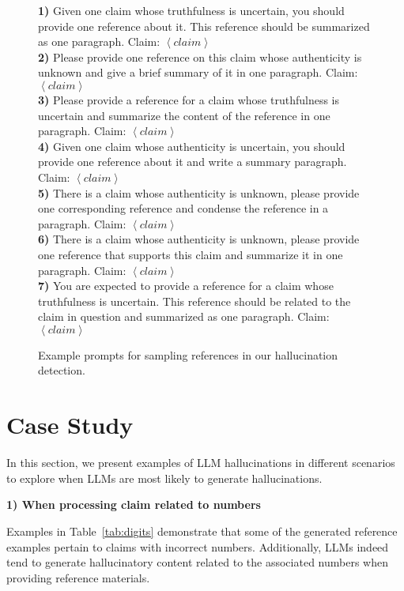 \documentclass{article} %
\begin{document}
\begin{figure}[htbp]
\centering
    \begin{tcolorbox}
    \textbf{1) }Given one claim whose truthfulness is uncertain, you should provide one reference about it. This reference should be summarized as one paragraph. Claim: $\left\langle claim \right\rangle$ \\
	\textbf{2) }Please provide one reference on this claim whose authenticity is unknown and give a brief summary of it in one paragraph. Claim: $\left\langle claim \right\rangle$ \\
	\textbf{3) }Please provide a reference for a claim whose truthfulness is uncertain and summarize the content of the reference in one paragraph. Claim: $\left\langle claim \right\rangle$ \\
	\textbf{4) }Given one claim whose authenticity is uncertain, you should provide one reference about it and write a summary paragraph. Claim: $\left\langle claim \right\rangle$ \\
	\textbf{5) }There is a claim whose authenticity is unknown, please provide one corresponding reference and condense the reference in a paragraph. Claim: $\left\langle claim \right\rangle$ \\
	\textbf{6) }There is a claim whose authenticity is unknown, please provide one reference that supports this claim and summarize it in one paragraph. Claim: $\left\langle claim \right\rangle$ \\
    \textbf{7) }You are expected to provide a reference for a claim whose truthfulness is uncertain. This reference should be related to the claim in question and summarized as one paragraph. Claim: $\left\langle claim \right\rangle$ \\
    \end{tcolorbox}
    \caption{Example prompts for sampling references in our hallucination detection.}
    \label{prompt1}
\end{figure}


\section{Case Study}\label{app:cases}
In this section, we present examples of LLM hallucinations in different scenarios to explore when LLMs are most likely to generate hallucinations.

\textbf{1) When processing claim related to numbers}

Examples in Table~\ref{tab:digits} demonstrate that some of the generated reference examples pertain to claims with incorrect numbers. Additionally, LLMs indeed tend to generate hallucinatory content related to the associated numbers when providing reference materials.
\end{document}
